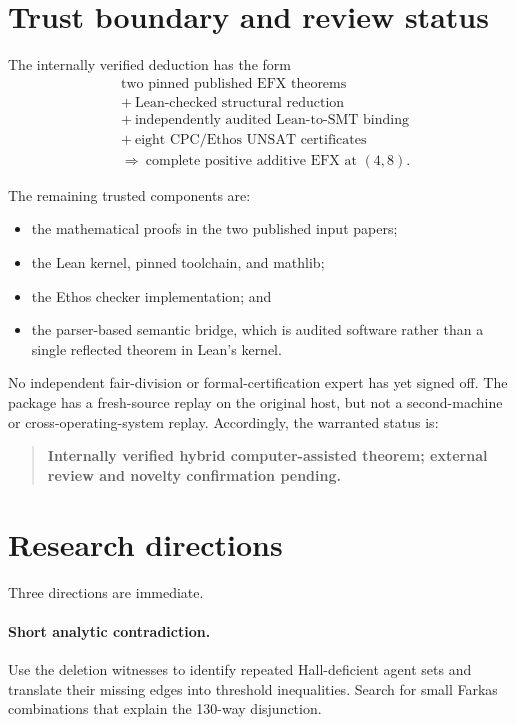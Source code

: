 \documentclass[11pt]{article}
\theoremstyle{definition}
\begin{document}
\section{Trust boundary and review status}

The internally verified deduction has the form
\[
\begin{aligned}
&\text{two pinned published EFX theorems}\\
&+\ \text{Lean-checked structural reduction}\\
&+\ \text{independently audited Lean-to-SMT binding}\\
&+\ \text{eight CPC/Ethos UNSAT certificates}\\
&\Longrightarrow\ \text{complete positive additive EFX at }(4,8).
\end{aligned}
\]

The remaining trusted components are:
\begin{itemize}[leftmargin=1.8em]
  \item the mathematical proofs in the two published input papers;
  \item the Lean kernel, pinned toolchain, and mathlib;
  \item the Ethos checker implementation; and
  \item the parser-based semantic bridge, which is audited software rather
  than a single reflected theorem in Lean's kernel.
\end{itemize}

No independent fair-division or formal-certification expert has yet signed
off. The package has a fresh-source replay on the original host, but not a
second-machine or cross-operating-system replay. Accordingly, the warranted
status is:
\begin{quote}
\textbf{Internally verified hybrid computer-assisted theorem; external
review and novelty confirmation pending.}
\end{quote}

\section{Research directions}

Three directions are immediate.

\paragraph{Short analytic contradiction.}
Use the deletion witnesses to identify repeated Hall-deficient agent sets and
translate their missing edges into threshold inequalities. Search for small
Farkas combinations that explain the 130-way disjunction.
\end{document}
